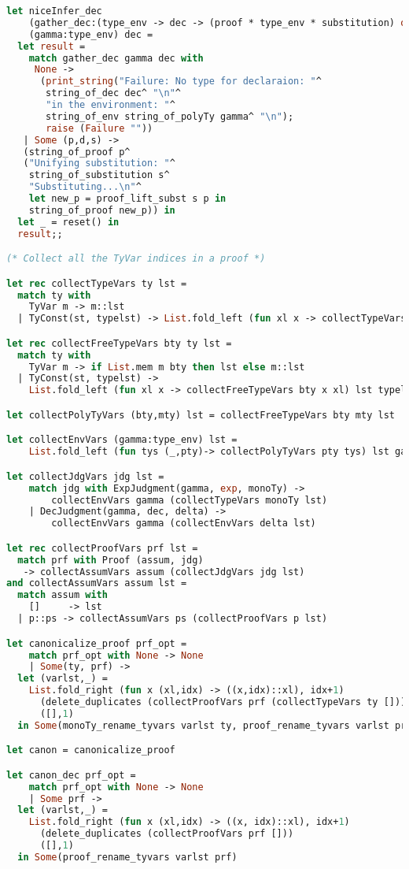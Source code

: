 \begin{lstlisting}[language=Caml, caption=definitions.ml]
let niceInfer_dec
    (gather_dec:(type_env -> dec -> (proof * type_env * substitution) option))
    (gamma:type_env) dec = 
  let result = 
    match gather_dec gamma dec with
     None ->
      (print_string("Failure: No type for declaraion: "^
       string_of_dec dec^ "\n"^
       "in the environment: "^
       string_of_env string_of_polyTy gamma^ "\n");
       raise (Failure ""))
   | Some (p,d,s) ->
   (string_of_proof p^
   ("Unifying substitution: "^
    string_of_substitution s^
    "Substituting...\n"^
    let new_p = proof_lift_subst s p in
    string_of_proof new_p)) in
  let _ = reset() in
  result;;

(* Collect all the TyVar indices in a proof *)

let rec collectTypeVars ty lst =
  match ty with
    TyVar m -> m::lst
  | TyConst(st, typelst) -> List.fold_left (fun xl x -> collectTypeVars x xl) lst typelst

let rec collectFreeTypeVars bty ty lst =
  match ty with
    TyVar m -> if List.mem m bty then lst else m::lst
  | TyConst(st, typelst) ->
    List.fold_left (fun xl x -> collectFreeTypeVars bty x xl) lst typelst

let collectPolyTyVars (bty,mty) lst = collectFreeTypeVars bty mty lst

let collectEnvVars (gamma:type_env) lst =
    List.fold_left (fun tys (_,pty)-> collectPolyTyVars pty tys) lst gamma

let collectJdgVars jdg lst =
    match jdg with ExpJudgment(gamma, exp, monoTy) ->
        collectEnvVars gamma (collectTypeVars monoTy lst)
    | DecJudgment(gamma, dec, delta) ->
        collectEnvVars gamma (collectEnvVars delta lst)

let rec collectProofVars prf lst =
  match prf with Proof (assum, jdg)
   -> collectAssumVars assum (collectJdgVars jdg lst)
and collectAssumVars assum lst =
  match assum with 
    []     -> lst
  | p::ps -> collectAssumVars ps (collectProofVars p lst)

let canonicalize_proof prf_opt =
    match prf_opt with None -> None
    | Some(ty, prf) ->
  let (varlst,_) =
    List.fold_right (fun x (xl,idx) -> ((x,idx)::xl), idx+1) 
      (delete_duplicates (collectProofVars prf (collectTypeVars ty []))) 
      ([],1)
  in Some(monoTy_rename_tyvars varlst ty, proof_rename_tyvars varlst prf)

let canon = canonicalize_proof

let canon_dec prf_opt =
    match prf_opt with None -> None
    | Some prf ->
  let (varlst,_) =
    List.fold_right (fun x (xl,idx) -> ((x, idx)::xl), idx+1) 
      (delete_duplicates (collectProofVars prf []))
      ([],1)
  in Some(proof_rename_tyvars varlst prf)


\end{lstlisting}
